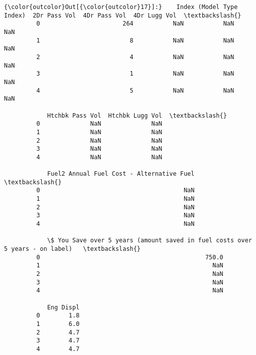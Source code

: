 \documentclass[11pt]{article}
\begin{document}
            \begin{Verbatim}[commandchars=\\\{\}]
{\color{outcolor}Out[{\color{outcolor}17}]:}    Index (Model Type Index)  2Dr Pass Vol  4Dr Pass Vol  4Dr Lugg Vol  \textbackslash{}
         0                       264           NaN           NaN           NaN   
         1                         8           NaN           NaN           NaN   
         2                         4           NaN           NaN           NaN   
         3                         1           NaN           NaN           NaN   
         4                         5           NaN           NaN           NaN   
         
            Htchbk Pass Vol  Htchbk Lugg Vol  \textbackslash{}
         0              NaN              NaN   
         1              NaN              NaN   
         2              NaN              NaN   
         3              NaN              NaN   
         4              NaN              NaN   
         
            Fuel2 Annual Fuel Cost - Alternative Fuel  \textbackslash{}
         0                                        NaN   
         1                                        NaN   
         2                                        NaN   
         3                                        NaN   
         4                                        NaN   
         
            \$ You Save over 5 years (amount saved in fuel costs over 5 years - on label)   \textbackslash{}
         0                                              750.0                               
         1                                                NaN                               
         2                                                NaN                               
         3                                                NaN                               
         4                                                NaN                               
         
            Eng Displ  
         0        1.8  
         1        6.0  
         2        4.7  
         3        4.7  
         4        4.7  
\end{Verbatim}
        
\end{document}
